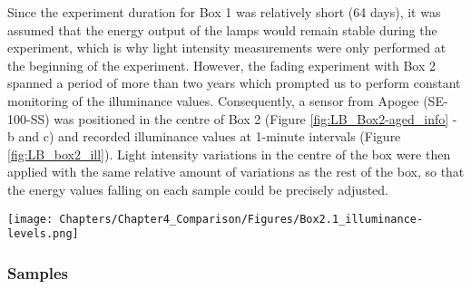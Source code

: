 

Since the experiment duration for Box 1 was relatively short (64 days), it was assumed that the energy output of the lamps would remain stable during the experiment, which is why light intensity measurements were only performed at the beginning of the experiment. However, the fading experiment with Box 2 spanned a period of more than two years which prompted us to perform constant monitoring of the illuminance values. Consequently, a sensor from Apogee (SE-100-SS) was positioned in the centre of Box 2 (Figure \ref{fig:LB_Box2-aged_info} - b and c) and recorded illuminance values at 1-minute intervals (Figure \ref{fig:LB_box2_ill}). Light intensity variations in the centre of the box were then applied with the same relative amount of variations as the rest of the box, so that the energy values falling on each sample could be precisely adjusted. \\


\begin{figure*}
\centering
\texttt{[image: Chapters/Chapter4\_Comparison/Figures/Box2.1\_illuminance-levels.png]}
\caption[\hspace{0.3cm}Average daily illuminance values at the centre of Box 2]{Average daily illuminance values at the centre of Box 2.}
\label{fig:LB_box2_ill}
\end{figure*}





\subsubsection{Samples}



